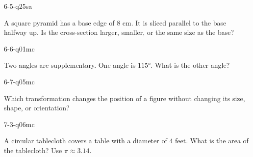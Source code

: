\begin{practiceQuestion}{6-5-q25}{sa}
\begin{questionText}
A square pyramid has a base edge of $8$ cm. It is sliced parallel to the base halfway up. Is the cross-section larger, smaller, or the same size as the base?
\end{questionText}
\end{practiceQuestion}

\begin{practiceQuestion}{6-6-q01}{mc}
\begin{questionText}
Two angles are supplementary. One angle is $115°$. What is the other angle?
\end{questionText}
\end{practiceQuestion}

\begin{practiceQuestion}{6-7-q05}{mc}
\begin{questionText}
Which transformation changes the position of a figure without changing its size, shape, or orientation?
\end{questionText}
\end{practiceQuestion}

\begin{practiceQuestion}{7-3-q06}{mc}
\begin{questionText}
A circular tablecloth covers a table with a diameter of $4$ feet. What is the area of the tablecloth? Use $\pi \approx 3.14$.
\end{questionText}
\end{practiceQuestion}

